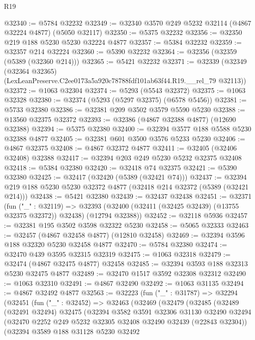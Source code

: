 \begin{lexlean}{R19}
\begin{coremodule}
@32340 := @5784 @32232
@32349 := @32340 @3570 @249 @5232 @32114 (@4867 @32224 @4877) (@5050 @32117)
@32350 := @5375 @32232
@32356 := @32350 @219 @188 @5230 @5230 @32224 @4877
@32357 := @5384 @32232
@32359 := @32357 @214 @32224
@32360 := @5390 @32232
@32364 := @32356 (@32359 (@5389 (@32360 @214)))
@32365 := @5421 @32232
@32371 := @32339
    (@32349 (@32364 @32365) (LexLeanPreserve.C2ee0173a5a920c78788fdf101ab63f44.R19.__rel_79 @32113))
@32372 := @1063 @32304
@32374 := @5293 (@5543 @32372)
@32375 := @1063 @32328
@32380 := @32374 (@5293 (@5297 @32375) (@6578 @5456))
@32381 := @5733 @32380
@32386 := @32381 @209 @3502 @3579 @5590 @5230
@32388 := @13560 @32375 @32372
@32393 := @32386 (@4867 @32388 @4877) (@12690 @32388)
@32394 := @5375 @32380
@32400 := @32394 @3577 @188 @5588 @5230 @32388 @4877
@32405 := @32381 @601 @3500 @3576 @5233 @5230
@32406 := @4867 @32375
@32408 := @4867 @32372 @4877
@32411 := @32405 (@32406 @32408) @32388
@32417 := @32394 @203 @249 @5230 @5232 @32375 @32408
@32418 := @5384 @32380
@32420 := @32418 @74 @32375
@32421 := @5390 @32380
@32425 := @32417 (@32420 (@5389 (@32421 @74)))
@32437 := @32394 @219 @188 @5230 @5230 @32372 @4877 (@32418 @214 @32372 (@5389 (@32421 @214)))
@32438 := @5421 @32380
@32439 := @32437 @32438
@32451 := @32371
    (fun ("_" : @32119) =>
    @32393 (@32400 (@32411 (@32425 @32439) (@13755 @32375 @32372)) @32438) (@12794 @32388))
@32452 := @32118 @5936
@32457 := @32381 @195 @3502 @3598 @32322 @5230
@32458 := @5065 @32333
@32463 := @32457 (@4867 @32458 @4877) (@12810 @32458)
@32469 := @32394 @3596 @188 @32320 @5230 @32458 @4877
@32470 := @5784 @32380
@32474 := @32470 @439 @3595 @32315 @32319
@32475 := @1063 @32318
@32479 := @32474 (@4867 @32475 @4877) @32458
@32485 := @32394 @3593 @188 @32313 @5230 @32475 @4877
@32489 := @32470 @1517 @3592 @32308 @32312
@32490 := @1063 @32310
@32491 := @4867 @32490
@32492 := @1063 @31135
@32494 := @4867 @32492 @4877
@32563 := @32223
    (fun ("_" : @31787) =>
    @32294
      (@32451
        (fun ("_" : @32452) =>
        @32463
          (@32469
            (@32479
              (@32485
                (@32489
                  (@32491 @32494)
                  @32475
                  (@32394
                    @3582
                    @3591
                    @32306
                    @31130
                    @32490
                    @32494
                    (@32470 @2252 @249 @5232 @32305 @32408 @32490 @32439 (@22843 @32304))
                    (@32394
                      @3589
                      @188
                      @31128
                      @5230
                      @32492

\end{coremodule}
\end{lexlean}
